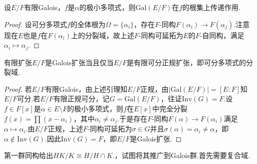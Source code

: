 \begin{lemma*}
    设$E/F$有限Galois，$f$是$\alpha$的极小多项式，则$\mathrm{Gal}(E/F)$在$f$的根集上传递作用.
\end{lemma*}
\begin{proof}
    设可分多项式$f$的全体根为$\Omega=\{\alpha_i\}$，存在$F$-同构$F(\alpha_i)\to F(\alpha_j)$.注意现在$E$也是$f$在$F(\alpha_i)$上的分裂域，故上述$F$-同构可延拓为$E$的$F$-自同构，满足$\alpha_i\mapsto\alpha_j$.
\end{proof}
\begin{prop}
    有限扩张$E/F$是Galois扩张当且仅当$E/F$是有限可分正规扩张，即可分多项式的分裂域.
\end{prop}
\begin{proof}
    若$E/F$有限Galois，由上述引理知$E/F$正规，由$|\mathrm{Gal}(E/F)|=[E:F]$知$E/F$可分.若$E/F$有限正规可分，记$G=\mathrm{Gal}(E/F)$，往证$\mathrm{Inv}(G)=F$.设$f\in F[x]$是$\alpha\in E\setminus F$的极小多项式，则$f$在$E[x]$中完全分裂$f(x)=\prod(x-\alpha_i)$，其中$\alpha_i\ne\alpha_j$.于是存在$F$-同构$F(\alpha)\to F(\alpha_i)$满足$\alpha\mapsto\alpha_i$.由$E/F$正规，上述$F$-同构可延拓为$\sigma\in G$并且$\sigma(\alpha)=\alpha_i\ne\alpha$，即$\alpha\notin\mathrm{Inv}(G)$.因此$\mathrm{Inv}(G)=F$，即$E/F$是Galois扩张.
\end{proof}

第一群同构给出$HK/K\cong H/H\cap K$.，试图将其推广到Galois群.首先需要复合域.

